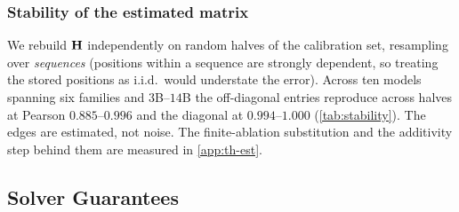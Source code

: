 \subsubsection{Stability of the estimated matrix}
\label{app:diagnostics}

We rebuild $\Hmat$ independently on random halves of the calibration set, resampling over
\emph{sequences} (positions within a sequence are strongly dependent, so treating the stored positions
as i.i.d.\ would understate the error). Across ten models spanning six families and $3$B--$14$B the
off-diagonal entries reproduce across halves at Pearson $0.885$--$0.996$ and the diagonal at
$0.994$--$1.000$ (\cref{tab:stability}). The edges are estimated, not noise. The finite-ablation
substitution and the additivity step behind them are measured in \cref{app:th-est}.

\begin{table}[htbp]
\centering\footnotesize
\caption{\textbf{Split-half stability of $\Hmat$}, resampled over calibration sequences, mean of four
random halvings. $\mathrm{Jac}(\lambda)$ is the Jaccard overlap of the two independently estimated $20\%$
selections. The edges reproduce nearly as well as the diagonal on every model.}
\label{tab:stability}

\end{table}

\begin{table}[htbp]
\centering\footnotesize
\caption{\textbf{Depth is invisible to the diagonal and monotone in the off-diagonal.} Spearman rank
correlation between a unit's layer index $\ell_u$ and its own saliency $\Hmat_{uu}$, and between
$\ell_u$ and its total coupling $b_u=\sum_{v\neq u}|\Hmat_{uv}|$. One $\Hmat$ per model, the same
build \cref{tab:stability} measures. Coupling is negative on all ten; the saliency column changes
sign across models.}
\label{tab:depth-grading}

\end{table}

\subsection{Solver Guarantees}

